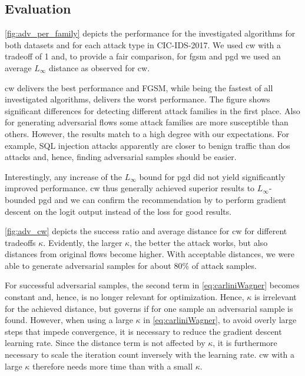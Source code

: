 \documentclass[conference]{IEEEtran}
\begin{document}
\subsection{Evaluation}
\autoref{fig:adv_per_family} depicts the performance for the investigated algorithms for both datasets and for each attack type in CIC-IDS-2017.
We used \gls{cw} with a tradeoff of 1 and, to provide a fair comparison, for \gls{fgsm} and \gls{pgd} we used an average $L_\infty$ distance as observed for \gls{cw}.

\gls{cw} delivers the best performance and FGSM, while being the fastest of all investigated algorithms, delivers the worst performance.
The figure shows significant differences for detecting different attack families in the first place. Also for generating adversarial flows some attack families are more susceptible than others. However, the results match to a high degree with our expectations. For example, SQL injection attacks apparently are closer to benign traffic than \gls{dos} attacks and, hence, finding adversarial samples should be easier.

Interestingly, any increase of the $L_\infty$ bound for \gls{pgd} did not yield significantly improved performance. 
\gls{cw} thus generally achieved superior results to $L_\infty$-bounded \gls{pgd}
and we can confirm the recommendation by \cite{carlini_towards_2017} to perform gradient descent on the logit output instead of the loss for good results.

\autoref{fig:adv_cw} depicts the success ratio and average distance for \gls{cw} for different tradeoffs $\kappa$.
Evidently, the larger $\kappa$, the better the attack works, but also distances from original flows become higher. With acceptable distances, we were able to generate adversarial samples for about 80\% of attack samples.

For successful adversarial samples, the second term in \autoref{eq:carliniWagner} becomes constant and, hence, is no longer relevant for optimization. Hence, $\kappa$ is irrelevant for the achieved distance, but governs if for one sample an adversarial sample is found.
However, when using a large $\kappa$ in \autoref{eq:carliniWagner}, to avoid overly large steps that impede convergence, it is necessary to reduce the gradient descent learning rate. Since the distance term is not affected by $\kappa$, it is furthermore necessary to scale the iteration count inversely with the learning rate. \gls{cw} with a large $\kappa$ therefore needs more time than with a small $\kappa$.
\end{document}
